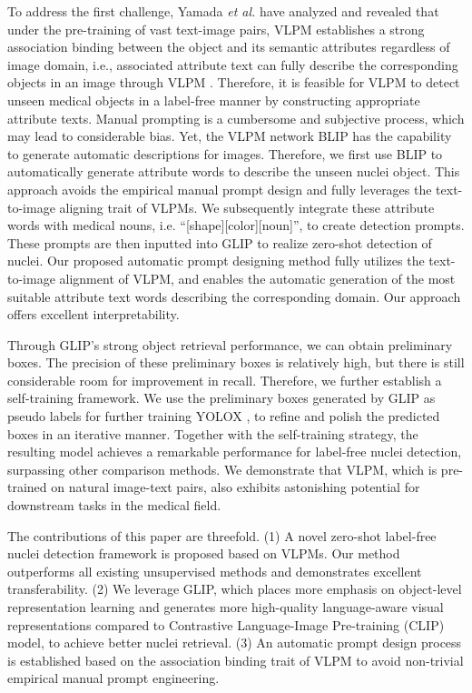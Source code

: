 \documentclass[runningheads]{llncs}
\begin{document}
To address the first challenge, Yamada \textit{et al.} have analyzed and revealed that under the pre-training of vast text-image pairs, VLPM establishes a strong association binding between the object and its semantic attributes regardless of image domain, i.e., associated attribute text can fully describe the corresponding objects in an image through VLPM \cite{yamada2022lemons}. Therefore, it is feasible for VLPM to detect unseen medical objects in a label-free manner by constructing appropriate attribute texts. Manual prompting is a cumbersome and subjective process, which may lead to considerable bias. Yet, the VLPM network BLIP \cite{li2022blip} has the capability to generate automatic descriptions for images. Therefore, we first use BLIP to automatically generate attribute words to describe the unseen nuclei object. This approach avoids the empirical manual prompt design and fully leverages the text-to-image aligning trait of VLPMs. We subsequently integrate these attribute words with medical nouns, i.e. ``[shape][color][noun]'', to create detection prompts. These prompts are then inputted into GLIP to realize zero-shot detection of nuclei. Our proposed automatic prompt designing method fully utilizes the text-to-image alignment of VLPM, and enables the automatic generation of the most suitable attribute text words describing the corresponding domain. Our approach offers excellent interpretability.

Through GLIP's strong object retrieval performance, we can obtain preliminary boxes. The precision of these preliminary boxes is relatively high, but there is still considerable room for improvement in recall. Therefore, we further establish a self-training framework. We use the preliminary boxes generated by GLIP as pseudo labels for further training YOLOX \cite{ge2021yolox}, to refine and polish the predicted boxes in an iterative manner. Together with the self-training strategy, the resulting model achieves a remarkable performance for label-free nuclei detection, surpassing other comparison methods. We demonstrate that VLPM, which is pre-trained on natural image-text pairs, also exhibits astonishing potential for downstream tasks in the medical field.

The contributions of this paper are threefold. (1) A novel zero-shot label-free nuclei detection framework is proposed based on VLPMs. Our method outperforms all existing unsupervised methods and demonstrates excellent transferability. (2) We leverage GLIP, which places more emphasis on object-level representation learning and generates more high-quality language-aware visual representations compared to Contrastive Language-Image Pre-training (CLIP) model, to achieve better nuclei retrieval. (3) An automatic prompt design process is established based on the association binding trait of VLPM to avoid non-trivial empirical manual prompt engineering.
\end{document}
